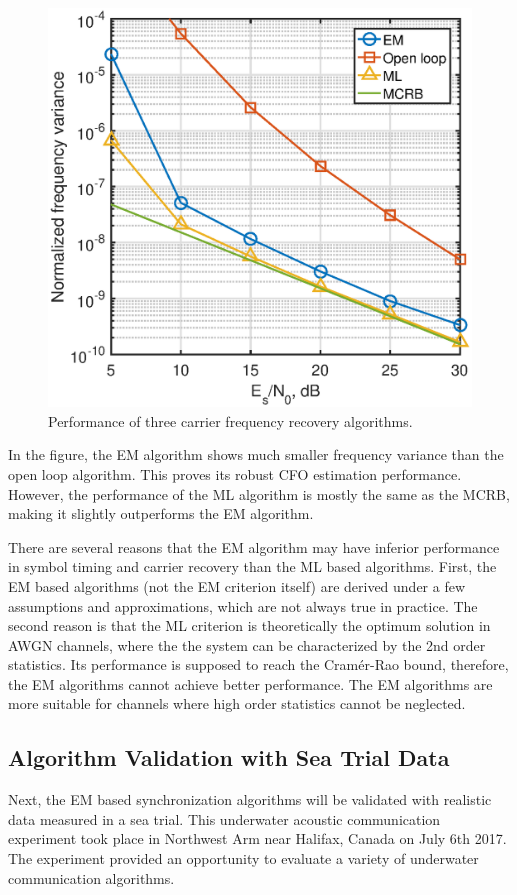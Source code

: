 \documentclass[journal,comsoc]{IEEEtran}
\begin{document}
\begin{figure}[ht]
\centering
\includegraphics[width=3 in]{pic/per_freq.eps}
\caption{Performance of three carrier frequency recovery algorithms.}
\label{fig:per_freq} 
\end{figure} 


In the figure, the EM algorithm shows much smaller frequency variance than the open loop algorithm. 
This proves its robust CFO estimation performance.
However, the performance of the ML algorithm is mostly the same as the MCRB, making it slightly outperforms the EM algorithm.

There are several reasons that the EM algorithm may have inferior performance in symbol timing and carrier recovery than the ML based algorithms.
First, the EM based algorithms (not the EM criterion itself) are derived under a few assumptions and approximations, which are not always true in practice.
The second reason is that the ML criterion is theoretically the optimum solution in AWGN channels, where the the system can be characterized by the 2nd order statistics.
Its performance is supposed to reach the Cram\'er-Rao bound, therefore, the EM algorithms cannot achieve better performance.
The EM algorithms are more suitable for channels where high order statistics cannot be neglected.


\subsection{Algorithm Validation with Sea Trial Data }
\label{sec:validation}
Next, the EM based synchronization algorithms will be validated with realistic data measured in a sea trial. 
This underwater acoustic communication experiment took place in Northwest Arm near Halifax, Canada on July 6th 2017. 
The experiment provided an opportunity to evaluate a variety of underwater communication algorithms.
\end{document}
